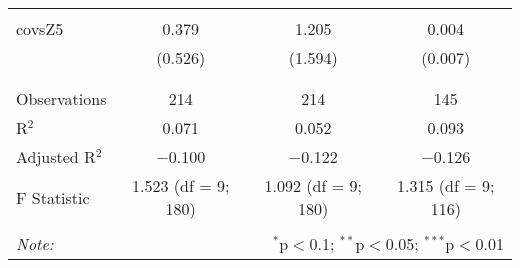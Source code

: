 \begin{table}[!htbp]
\begin{tabular}{@{\extracolsep{5pt}}lccc}
  & & & \\ 
 covsZ5 & 0.379 & 1.205 & 0.004 \\ 
  & (0.526) & (1.594) & (0.007) \\ 
  & & & \\ 
\hline \\[-1.8ex] 
Observations & 214 & 214 & 145 \\ 
R$^{2}$ & 0.071 & 0.052 & 0.093 \\ 
Adjusted R$^{2}$ & $-$0.100 & $-$0.122 & $-$0.126 \\ 
F Statistic & 1.523 (df = 9; 180) & 1.092 (df = 9; 180) & 1.315 (df = 9; 116) \\ 
\hline 
\hline \\[-1.8ex] 
\textit{Note:}  & \multicolumn{3}{r}{$^{*}$p$<$0.1; $^{**}$p$<$0.05; $^{***}$p$<$0.01} \\ 
\end{tabular} 
\end{table} 
